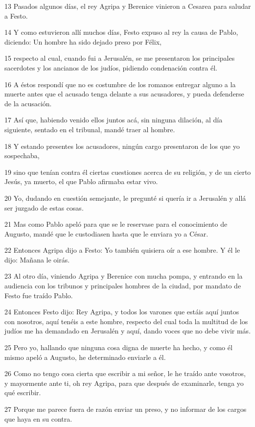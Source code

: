 \par 13 Pasados algunos días, el rey Agripa y Berenice vinieron a Cesarea para saludar a Festo.
\par 14 Y como estuvieron allí muchos días, Festo expuso al rey la causa de Pablo, diciendo: Un hombre ha sido dejado preso por Félix,
\par 15 respecto al cual, cuando fui a Jerusalén, se me presentaron los principales sacerdotes y los ancianos de los judíos, pidiendo condenación contra él.
\par 16 A éstos respondí que no es costumbre de los romanos entregar alguno a la muerte antes que el acusado tenga delante a sus acusadores, y pueda defenderse de la acusación.
\par 17 Así que, habiendo venido ellos juntos acá, sin ninguna dilación, al día siguiente, sentado en el tribunal, mandé traer al hombre.
\par 18 Y estando presentes los acusadores, ningún cargo presentaron de los que yo sospechaba,
\par 19 sino que tenían contra él ciertas cuestiones acerca de su religión, y de un cierto Jesús, ya muerto, el que Pablo afirmaba estar vivo.
\par 20 Yo, dudando en cuestión semejante, le pregunté si quería ir a Jerusalén y allá ser juzgado de estas cosas.
\par 21 Mas como Pablo apeló para que se le reservase para el conocimiento de Augusto, mandé que le custodiasen hasta que le enviara yo a César.
\par 22 Entonces Agripa dijo a Festo: Yo también quisiera oír a ese hombre. Y él le dijo: Mañana le oirás.
\par 23 Al otro día, viniendo Agripa y Berenice con mucha pompa, y entrando en la audiencia con los tribunos y principales hombres de la ciudad, por mandato de Festo fue traído Pablo.
\par 24 Entonces Festo dijo: Rey Agripa, y todos los varones que estáis aquí juntos con nosotros, aquí tenéis a este hombre, respecto del cual toda la multitud de los judíos me ha demandado en Jerusalén y aquí, dando voces que no debe vivir más.
\par 25 Pero yo, hallando que ninguna cosa digna de muerte ha hecho, y como él mismo apeló a Augusto, he determinado enviarle a él.
\par 26 Como no tengo cosa cierta que escribir a mi señor, le he traído ante vosotros, y mayormente ante ti, oh rey Agripa, para que después de examinarle, tenga yo qué escribir.
\par 27 Porque me parece fuera de razón enviar un preso, y no informar de los cargos que haya en su contra.

